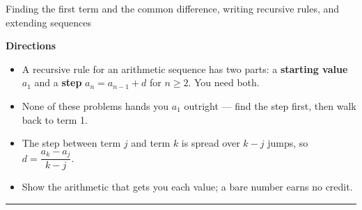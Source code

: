 \documentclass[12pt]{article}
\begin{document}

\begin{center}
\small Finding the first term and the common difference, writing recursive rules, and extending sequences
\end{center}
\vspace{0.15cm}

\noindent\textbf{Directions}
\begin{itemize}[leftmargin=0.8cm, itemsep=1pt, topsep=2pt]
  \item A recursive rule for an arithmetic sequence has two parts: a \textbf{starting value} $a_1$ and a \textbf{step} $a_n = a_{n-1} + d$ for $n \ge 2$. You need both.
  \item None of these problems hands you $a_1$ outright --- find the step first, then walk back to term 1.
  \item The step between term $j$ and term $k$ is spread over $k - j$ jumps, so $d = \dfrac{a_k - a_j}{k - j}$.
  \item Show the arithmetic that gets you each value; a bare number earns no credit.
\end{itemize}

\vspace{0.2cm}
\noindent\rule{\linewidth}{0.4pt}


\end{document}
